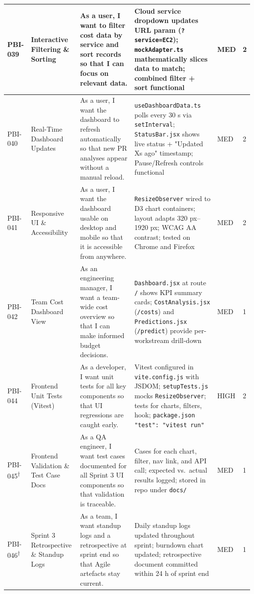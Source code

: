 \documentclass[10pt,a4paper]{article}
\begin{document}
\begin{tabularx}{\textwidth}{|L{1.4cm}|L{3.2cm}|X|L{3cm}|L{1cm}|L{0.6cm}|}
PBI-039 &
Interactive Filtering \& Sorting &
As a user, I want to filter cost data by service and sort records so that I can focus on relevant data. &
Cloud service dropdown updates URL param (\texttt{?service=EC2}); \texttt{mockAdapter.ts} mathematically slices data to match; combined filter + sort functional &
MED & 2 \\ \hline

PBI-040 &
Real-Time Dashboard Updates &
As a user, I want the dashboard to refresh automatically so that new PR analyses appear without a manual reload. &
\texttt{useDashboardData.ts} polls every 30 s via \texttt{setInterval}; \texttt{StatusBar.jsx} shows live status + "Updated Xs ago" timestamp; Pause/Refresh controls functional &
MED & 2 \\ \hline

PBI-041 &
Responsive UI \& Accessibility &
As a user, I want the dashboard usable on desktop and mobile so that it is accessible from anywhere. &
\texttt{ResizeObserver} wired to D3 chart containers; layout adapts 320 px–1920 px; WCAG AA contrast; tested on Chrome and Firefox &
MED & 2 \\ \hline

PBI-042 &
Team Cost Dashboard View &
As an engineering manager, I want a team-wide cost overview so that I can make informed budget decisions. &
\texttt{Dashboard.jsx} at route \texttt{/} shows KPI summary cards; \texttt{CostAnalysis.jsx} (\texttt{/costs}) and \texttt{Predictions.jsx} (\texttt{/predict}) provide per-workstream drill-down &
MED & 1 \\ \hline

PBI-044 &
Frontend Unit Tests (Vitest) &
As a developer, I want unit tests for all key components so that UI regressions are caught early. &
Vitest configured in \texttt{vite.config.js} with JSDOM; \texttt{setupTests.js} mocks \texttt{ResizeObserver}; tests for charts, filters, hook; \texttt{package.json} \texttt{"test": "vitest run"} &
HIGH & 2 \\ \hline

PBI-045\textsuperscript{$\dagger$} &
Frontend Validation \& Test Case Docs &
As a QA engineer, I want test cases documented for all Sprint 3 UI components so that validation is traceable. &
Cases for each chart, filter, nav link, and API call; expected vs.\ actual results logged; stored in repo under \texttt{docs/} &
MED & 1 \\ \hline

PBI-046\textsuperscript{$\dagger$} &
Sprint 3 Retrospective \& Standup Logs &
As a team, I want standup logs and a retrospective at sprint end so that Agile artefacts stay current. &
Daily standup logs updated throughout sprint; burndown chart updated; retrospective document committed within 24 h of sprint end &
MED & 1 \\ \hline

\end{tabularx}
\end{document}
